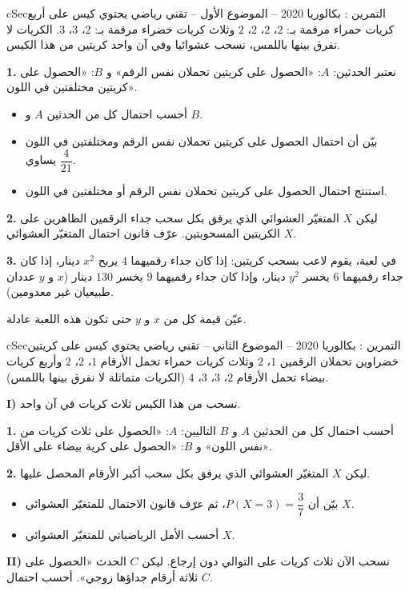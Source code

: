 \documentclass[12pt,a4paper]{article}
\newenvironment{BOX}[2]{\begin{otherlanguage}{english}\begin{arbox}{#1}{#2}}{\end{arbox}\end{otherlanguage}}
\newcounter{exo}
\newenvironment{tamrin}[1]{\stepcounter{exo}\begin{BOX}{cSec}{التمرين \theexo: #1}}{\end{BOX}}
\newenvironment{sq}{\begin{itemize}[leftmargin=2.4em,itemsep=3pt]}{\end{itemize}}
\newcommand{\qa}{\item[(أ)]}\newcommand{\qb}{\item[(ب)]}\newcommand{\qc}{\item[(جـ)]}\newcommand{\qd}{\item[(د)]}\newcommand{\qe}{\item[(هـ)]}
\newcommand{\QQ}[1]{\par\smallskip\textbf{#1.} }
\begin{document}
\begin{tamrin}{بكالوريا 2020 -- الموضوع الأول -- تقني رياضي}
يحتوي كيس على أربع كريات حمراء مرقمة بـ: $2$، $2$، $2$، $2$ وثلاث كريات خضراء مرقمة بـ: $2$، $3$، $3$. الكريات لا نفرق بينها باللمس، نسحب عشوائيا وفي آن واحد كريتين من هذا الكيس.
\QQ{1} نعتبر الحدثين: $A$: «الحصول على كريتين تحملان نفس الرقم» و $B$: «الحصول على كريتين مختلفتين في اللون».
\begin{sq}
\qa أحسب احتمال كل من الحدثين $A$ و $B$.
\qb بيّن أن احتمال الحصول على كريتين تحملان نفس الرقم ومختلفتين في اللون يساوي $\dfrac{4}{21}$.
\qc استنتج احتمال الحصول على كريتين تحملان نفس الرقم أو مختلفتين في اللون.
\end{sq}
\QQ{2} ليكن $X$ المتغيّر العشوائي الذي يرفق بكل سحب جداء الرقمين الظاهرين على الكريتين المسحوبتين. عرّف قانون احتمال المتغيّر العشوائي $X$.
\QQ{3} في لعبة، يقوم لاعب بسحب كريتين: إذا كان جداء رقميهما $4$ يربح $x^2$ دينار، إذا كان جداء رقميهما $6$ يخسر $y^2$ دينار، وإذا كان جداء رقميهما $9$ يخسر $130$ دينار ($x$ و $y$ عددان طبيعيان غير معدومين).

عيّن قيمة كل من $x$ و $y$ حتى تكون هذه اللعبة عادلة.
\end{tamrin}

\begin{tamrin}{بكالوريا 2020 -- الموضوع الثاني -- تقني رياضي}
يحتوي كيس على كريتين خضراوين تحملان الرقمين $1$، $2$ وثلاث كريات حمراء تحمل الأرقام $1$، $2$، $2$ وأربع كريات بيضاء تحمل الأرقام $2$، $3$، $3$، $4$ (الكريات متماثلة لا نفرق بينها باللمس).

\textbf{I)} نسحب من هذا الكيس ثلاث كريات في آن واحد.
\QQ{1} أحسب احتمال كل من الحدثين $A$ و $B$ التاليين: $A$: «الحصول على ثلاث كريات من نفس اللون» و $B$: «الحصول على كرية بيضاء على الأقل».
\QQ{2} ليكن $X$ المتغيّر العشوائي الذي يرفق بكل سحب أكبر الأرقام المحصل عليها.
\begin{sq}
\qa بيّن أن $P(X=3)=\dfrac{3}{7}$، ثم عرّف قانون الاحتمال للمتغيّر العشوائي $X$.
\qb أحسب الأمل الرياضياتي للمتغيّر العشوائي $X$.
\end{sq}
\textbf{II)} نسحب الآن ثلاث كريات على التوالي دون إرجاع. ليكن $C$ الحدث «الحصول على ثلاثة أرقام جداؤها زوجي». أحسب احتمال $C$.
\end{tamrin}
\end{document}
